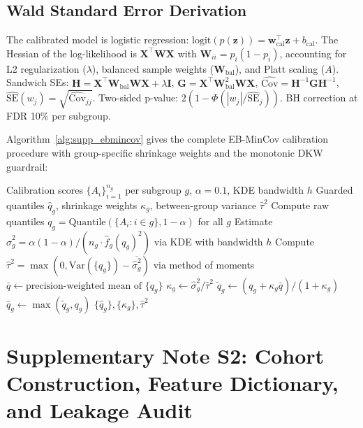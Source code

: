 \documentclass[11pt,a4paper]{article}
\theoremstyle{plain}
\begin{document}
\subsection{Wald Standard Error Derivation}

The calibrated model is logistic regression: $\text{logit}(p(\mathbf z)) = \mathbf w_{\text{cal}}^\top \mathbf z + b_{\text{cal}}$. The Hessian of the log-likelihood is $\mathbf X^\top \mathbf W \mathbf X$ with $\mathbf W_{ii}=p_i(1-p_i)$, accounting for L2 regularization ($\lambda$), balanced sample weights ($\mathbf W_{\text{bal}}$), and Platt scaling ($A$). Sandwich SEs: $\mathbf H = \mathbf X^\top \mathbf W_{\text{bal}} \mathbf W \mathbf X + \lambda \mathbf I$, $\mathbf G = \mathbf X^\top \mathbf W_{\text{bal}}^2 \mathbf W \mathbf X$, $\widehat{\mathrm{Cov}} = \mathbf H^{-1} \mathbf G \mathbf H^{-1}$, $\widehat{\mathrm{SE}}(w_j) = \sqrt{\widehat{\mathrm{Cov}}_{jj}}$. Two-sided p-value: $2(1-\Phi(|w_j|/\widehat{\mathrm{SE}}_j))$. BH correction at FDR 10\% per subgroup.

Algorithm~\ref{alg:supp_ebmincov} gives the complete EB-MinCov calibration procedure with group-specific shrinkage weights and the monotonic DKW guardrail:

\begin{algorithm}[htbp]
\caption{Supplementary Algorithm: EB-MinCov Calibration (Expanded)}
\label{alg:supp_ebmincov}
\begin{algorithmic}[1]
\Require Calibration scores $\{A_i\}_{i=1}^{n_g}$ per subgroup $g$, $\alpha=0.1$, KDE bandwidth $h$
\Ensure Guarded quantiles $\hat q_g$, shrinkage weights $\kappa_g$, between-group variance $\hat\tau^2$
\State Compute raw quantiles $q_g = \text{Quantile}(\{A_i : i \in g\}, 1-\alpha)$ for all $g$
\State Estimate $\hat\sigma_g^2 = \alpha(1-\alpha)/(n_g \cdot \hat f_g(q_g)^2)$ via KDE with bandwidth $h$
\State Compute $\hat\tau^2 = \max(0, \text{Var}(\{q_g\}) - \overline{\hat\sigma_g^2})$ via method of moments
\State $\bar q \gets \text{precision-weighted mean of } \{q_g\}$
  \State $\kappa_g \gets \hat\sigma_g^2 / \hat\tau^2$
  \State $\tilde q_g \gets (q_g + \kappa_g \bar q)/(1+\kappa_g)$
  \State $\hat q_g \gets \max(\tilde q_g, q_g)$
\EndFor
\State \Return $\{\hat q_g\}, \{\kappa_g\}, \hat\tau^2$
\end{algorithmic}
\end{algorithm}

\section{Supplementary Note S2: Cohort Construction, Feature Dictionary, and Leakage Audit}
\label{sec:cohort}
\end{document}
